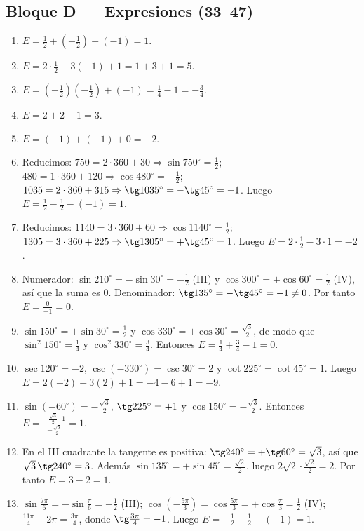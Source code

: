 \documentclass[12pt, letterpaper]{article}
\providecommand{\sen}{\sin}
\begin{document}
\subsection*{Bloque D — Expresiones (33--47)}
\begin{enumerate}[leftmargin=*, label=\textbf{\arabic*.}, start=33]
  \item $E=\frac12+\left(-\frac12\right)-(-1)=1$.
  \item $E=2\cdot\frac12-3(-1)+1=1+3+1=5$.
  \item $E=\left(-\frac12\right)\left(-\frac12\right)+(-1)=\frac14-1=-\frac34$.
  \item $E=2+2-1=3$.
  \item $E=(-1)+(-1)+0=-2$.
  \item Reducimos: $750=2\cdot360+30\Rightarrow\sen 750^\circ=\frac12$; $480=1\cdot360+120\Rightarrow\cos 480^\circ=-\frac12$; $1035=2\cdot360+315\Rightarrow\tg 1035^\circ=-\tg 45^\circ=-1$. Luego $E=\frac12-\frac12-(-1)=1$.
  \item Reducimos: $1140=3\cdot360+60\Rightarrow\cos 1140^\circ=\frac12$; $1305=3\cdot360+225\Rightarrow\tg 1305^\circ=+\tg 45^\circ=1$. Luego $E=2\cdot\frac12-3\cdot1=-2$.
  \item Numerador: $\sen 210^\circ=-\sen 30^\circ=-\frac12$ (III) y $\cos 300^\circ=+\cos 60^\circ=\frac12$ (IV), así que la suma es $0$. Denominador: $\tg 135^\circ=-\tg 45^\circ=-1\neq0$. Por tanto $E=\frac{0}{-1}=0$.
  \item $\sen 150^\circ=+\sen 30^\circ=\frac12$ y $\cos 330^\circ=+\cos 30^\circ=\frac{\sqrt{3}}{2}$, de modo que $\sen^2 150^\circ=\frac14$ y $\cos^2 330^\circ=\frac34$. Entonces $E=\frac14+\frac34-1=0$.
  \item $\sec 120^\circ=-2$, $\csc(-330^\circ)=\csc 30^\circ=2$ y $\cot 225^\circ=\cot 45^\circ=1$. Luego $E=2(-2)-3(2)+1=-4-6+1=-9$.
  \item $\sen(-60^\circ)=-\frac{\sqrt{3}}{2}$, $\tg 225^\circ=+1$ y $\cos 150^\circ=-\frac{\sqrt{3}}{2}$. Entonces $E=\frac{-\frac{\sqrt{3}}{2}\cdot1}{-\frac{\sqrt{3}}{2}}=1$.
  \item En el III cuadrante la tangente es positiva: $\tg 240^\circ=+\tg 60^\circ=\sqrt{3}$, así que $\sqrt{3}\,\tg 240^\circ=3$. Además $\sen 135^\circ=+\sen 45^\circ=\frac{\sqrt{2}}{2}$, luego $2\sqrt{2}\cdot\frac{\sqrt{2}}{2}=2$. Por tanto $E=3-2=1$.
  \item $\sen\frac{7\pi}{6}=-\sen\frac{\pi}{6}=-\frac12$ (III); $\cos\left(-\frac{5\pi}{3}\right)=\cos\frac{5\pi}{3}=+\cos\frac{\pi}{3}=\frac12$ (IV); $\frac{11\pi}{4}-2\pi=\frac{3\pi}{4}$, donde $\tg\frac{3\pi}{4}=-1$. Luego $E=-\frac12+\frac12-(-1)=1$.

\end{enumerate}
\end{document}
